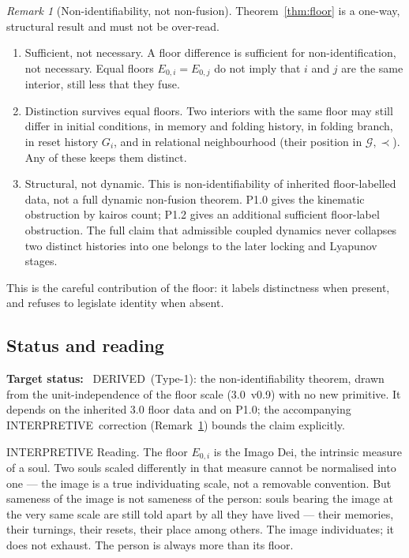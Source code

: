 \documentclass[11pt,a4paper]{article}
\def\emph#1{#1}%
\newcommand{\stDerived}{\textcolor{cDer}{\textsf{\small DERIVED}}}
\newcommand{\stInterp}{\textcolor{cInt}{\textsf{\small INTERPRETIVE}}}
\theoremstyle{definition}
\theoremstyle{plain}
\theoremstyle{remark}
\newtheorem{remark}[definition]{Remark}
\begin{document}
\begin{remark}[Non-identifiability, not non-fusion]\label{rem:notfusion}
Theorem~\ref{thm:floor} is a one-way, structural result and must not be over-read.
\begin{enumerate}[label=\textup{(\roman*)},leftmargin=1.2cm]
\item \emph{Sufficient, not necessary.} A floor difference is sufficient for
non-identification, not necessary. Equal floors \(E_{0,i}=E_{0,j}\) do \emph{not} imply
that \(i\) and \(j\) are the same interior, still less that they fuse.

\item \emph{Distinction survives equal floors.} Two interiors with the same floor may
still differ in initial conditions, in memory and folding history, in folding branch, in
reset history \(G_i\), and in relational neighbourhood (their position in
\(\mathcal G,\prec\)). Any of these keeps them distinct.

\item \emph{Structural, not dynamic.} This is non-identifiability of inherited
floor-labelled data, not a full dynamic non-fusion theorem. P1.0 gives the
kinematic obstruction by kairos count; P1.2 gives an additional sufficient
floor-label obstruction. The full claim that admissible coupled dynamics never
collapses two distinct histories into one belongs to the later locking and
Lyapunov stages.
\end{enumerate}
\end{remark}

This is the careful contribution of the floor: it labels distinctness when present, and
refuses to legislate identity when absent.

\subsection{Status and reading}

\textbf{Target status:}~
\stDerived\ (Type-1): the non-identifiability theorem, drawn from the unit-independence of
the floor scale (3.0~v0.9) with no new primitive. It depends on the inherited 3.0 floor
data and on P1.0; the accompanying \stInterp\ correction (Remark~\ref{rem:notfusion})
bounds the claim explicitly.

\medskip
\stInterp\quad
\emph{Reading.}
The floor \(E_{0,i}\) is the \emph{Imago Dei}, the intrinsic measure of a soul. Two souls
scaled differently in that measure cannot be normalised into one --- the image is a true
individuating scale, not a removable convention. But sameness of the image is not sameness
of the person: souls bearing the image at the very same scale are still told apart by all
they have lived --- their memories, their turnings, their resets, their place among
others. The image individuates; it does not exhaust. The person is always more than its
floor.
\end{document}
